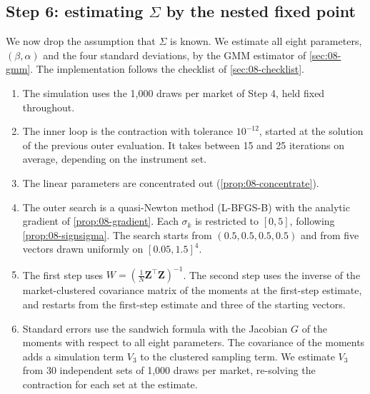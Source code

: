 \subsection{Step 6: estimating \texorpdfstring{$\Sigma$}{Sigma} by the nested fixed point}\label{sec:08-worked-nfxp}

We now drop the assumption that $\Sigma$ is known. We estimate all eight parameters, $(\beta, \alpha)$ and the four
standard deviations, by the GMM estimator of \cref{sec:08-gmm}. The implementation follows the checklist of
\cref{sec:08-checklist}.
\begin{enumerate}
  \item The simulation uses the 1,000 draws per market of Step 4, held fixed throughout.
  \item The inner loop is the contraction with tolerance $10^{-12}$, started at the solution of the previous outer
  evaluation. It takes between 15 and 25 iterations on average, depending on the instrument set.
  \item The linear parameters are concentrated out (\cref{prop:08-concentrate}).
  \item The outer search is a quasi-Newton method (L-BFGS-B) with the analytic gradient of
  \cref{prop:08-gradient}. Each $\sigma_k$ is restricted to $[0, 5]$, following \cref{prop:08-signsigma}. The search
  starts from $(0.5, 0.5, 0.5, 0.5)$ and from five vectors drawn uniformly on $[0.05, 1.5]^4$.
  \item The first step uses $W = (\frac{1}{N}\bm{Z}^\top \bm{Z})^{-1}$. The second step uses the inverse of the
  market-clustered covariance matrix of the moments at the first-step estimate, and restarts from the first-step
  estimate and three of the starting vectors.
  \item Standard errors use the sandwich formula with the Jacobian $G$ of the moments with respect to all eight
  parameters. The covariance of the moments adds a simulation term $V_3$ to the clustered sampling term. We estimate
  $V_3$ from 30 independent sets of 1,000 draws per market, re-solving the contraction for each set at the estimate.
\end{enumerate}

